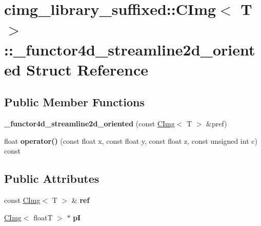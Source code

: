 \hypertarget{structcimg__library__suffixed_1_1CImg_1_1__functor4d__streamline2d__oriented}{}\section{cimg\+\_\+library\+\_\+suffixed\+:\+:C\+Img$<$ T $>$\+:\+:\+\_\+functor4d\+\_\+streamline2d\+\_\+oriented Struct Reference}
\label{structcimg__library__suffixed_1_1CImg_1_1__functor4d__streamline2d__oriented}
\subsection*{Public Member Functions}
\begin{DoxyCompactItemize}
\item 
\mbox{\label{structcimg__library__suffixed_1_1CImg_1_1__functor4d__streamline2d__oriented_a9a249a9654fe898ee66e6eb6802a4b88}} 
{\bfseries \+\_\+functor4d\+\_\+streamline2d\+\_\+oriented} (const \hyperlink{structcimg__library__suffixed_1_1CImg}{C\+Img}$<$ T $>$ \&pref)
\item 
\mbox{\label{structcimg__library__suffixed_1_1CImg_1_1__functor4d__streamline2d__oriented_aaf4ebdef352f0c57658a8ca758633519}} 
float {\bfseries operator()} (const float x, const float y, const float z, const unsigned int c) const
\end{DoxyCompactItemize}
\subsection*{Public Attributes}
\begin{DoxyCompactItemize}
\item 
\mbox{\label{structcimg__library__suffixed_1_1CImg_1_1__functor4d__streamline2d__oriented_af5aa2bceac87392a9697224e2937e951}} 
const \hyperlink{structcimg__library__suffixed_1_1CImg}{C\+Img}$<$ T $>$ \& {\bfseries ref}
\item 
\mbox{\label{structcimg__library__suffixed_1_1CImg_1_1__functor4d__streamline2d__oriented_afe07c57a8dac96c0bca4b4291544be0a}} 
\hyperlink{structcimg__library__suffixed_1_1CImg}{C\+Img}$<$ floatT $>$ $\ast$ {\bfseries pI}
\end{DoxyCompactItemize}



